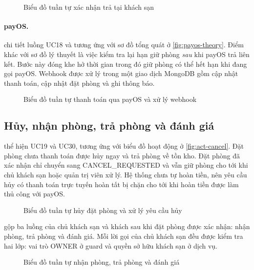 \begin{figure}[H]
\centering
{}
\caption{Biểu đồ tuần tự xác nhận trả tại khách sạn}\label{fig:seq-pay-at-hotel}
\end{figure}


\paragraph{payOS.}  chi tiết luồng UC18 và tương ứng với sơ đồ tổng quát ở \cref{fig:payos-theory}. Điểm khác với sơ đồ lý thuyết là việc kiểm tra lại hạn giữ phòng \emph{sau} khi payOS trả liên kết. Bước này đóng khe hở thời gian trong đó giữ phòng có thể hết hạn khi đang gọi payOS. Webhook được xử lý trong một giao dịch MongoDB gồm cập nhật thanh toán, cập nhật đặt phòng và ghi thông báo.

\begin{figure}[H]
\centering
{}
\caption{Biểu đồ tuần tự thanh toán qua payOS và xử lý webhook}\label{fig:seq-payos}
\end{figure}

\subsection{Hủy, nhận phòng, trả phòng và đánh giá}

 thể hiện UC19 và UC30, tương ứng với biểu đồ hoạt động ở \cref{fig:act-cancel}. Đặt phòng chưa thanh toán được hủy ngay và trả phòng về tồn kho. Đặt phòng đã xác nhận chỉ chuyển sang CANCEL\_REQUESTED và vẫn giữ phòng cho tới khi chủ khách sạn hoặc quản trị viên xử lý. Hệ thống chưa tự hoàn tiền, nên yêu cầu hủy có thanh toán trực tuyến hoàn tất bị chặn cho tới khi hoàn tiền được làm thủ công với payOS.

\begin{figure}[H]
\centering
{}
\caption{Biểu đồ tuần tự hủy đặt phòng và xử lý yêu cầu hủy}\label{fig:seq-cancel}
\end{figure}

 gộp ba luồng của chủ khách sạn và khách sau khi đặt phòng được xác nhận: nhận phòng, trả phòng và đánh giá. Mỗi lời gọi của chủ khách sạn đều được kiểm tra hai lớp: vai trò OWNER ở guard và quyền sở hữu khách sạn ở dịch vụ.

\begin{figure}[H]
\centering
{}
\caption{Biểu đồ tuần tự nhận phòng, trả phòng và đánh giá}\label{fig:seq-stay}
\end{figure}

